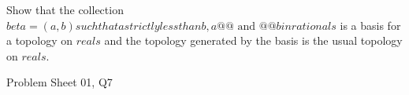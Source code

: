 \begin{samepage}
\begin{ex}
Show that the collection $beta = {{ (a,b) such that a strictly less than b, a @@\text{ and }@@ b in rationals }}$ is a basis for a topology on $reals$ and the topology generated by the basis is the usual topology on $reals$.
\end{ex}
\begin{source}
Problem Sheet 01, Q7
\end{source}
\end{samepage}
